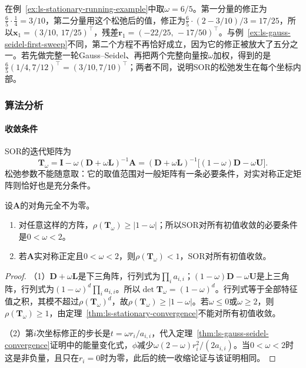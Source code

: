 \begin{example}[SOR迭代的第一轮]
\label{ex:ls-sor-first-sweep}
在例~\ref{ex:ls-stationary-running-example}中取$\omega=6/5$。第一分量的修正为$\tfrac65\cdot\tfrac14=3/10$，第二分量用这个松弛后的值，修正为$\tfrac65\cdot(2-3/10)/3=17/25$，所以$\bm x_1=(3/10,\,17/25)^\top$，残差$\bm r_1=(-22/25,\,-17/50)^\top$。与例~\ref{ex:ls-gauss-seidel-first-sweep}不同，第二个方程不再恰好成立，因为它的修正被放大了五分之一。若先做完整一轮Gauss--Seidel、再把两个完整向量按$\omega$加权，得到的是$\tfrac65(1/4,7/12)^\top=(3/10,7/10)^\top$；两者不同，说明SOR的松弛发生在每个坐标内部。
\end{example}

\subsubsection{算法分析}

\paragraph{收敛条件}
SOR的迭代矩阵为
\[
\bm T_\omega=\bm I-\omega(\bm D+\omega\bm L)^{-1}\bm A=(\bm D+\omega\bm L)^{-1}\bigl[(1-\omega)\bm D-\omega\bm U\bigr].
\]
松弛参数不能随意取：它的取值范围对一般矩阵有一条必要条件，对实对称正定矩阵则恰好也是充分条件。
\begin{theorem}[SOR迭代的收敛条件]
\label{thm:ls-sor-convergence}
设$\bm A$的对角元全不为零。
\begin{enumerate}
\item 对任意这样的方阵，$\rho(\bm T_\omega)\geq|1-\omega|$；所以SOR对所有初值收敛的必要条件是$0<\omega<2$。
\item 若$\bm A$实对称正定且$0<\omega<2$，则$\rho(\bm T_\omega)<1$，SOR对所有初值收敛。
\end{enumerate}
\end{theorem}
\begin{proof}
（1）$\bm D+\omega\bm L$是下三角阵，行列式为$\prod_i a_{i,i}$；$(1-\omega)\bm D-\omega\bm U$是上三角阵，行列式为$(1-\omega)^d\prod_i a_{i,i}$。所以$\det\bm T_\omega=(1-\omega)^d$。行列式等于全部特征值之积，其模不超过$\rho(\bm T_\omega)^d$，故$\rho(\bm T_\omega)\geq|1-\omega|$。若$\omega\leq0$或$\omega\geq2$，则$\rho(\bm T_\omega)\geq1$，由定理~\ref{thm:ls-stationary-convergence}不能对所有初值收敛。

（2）第$i$次坐标修正的步长是$t=\omega r_i/a_{i,i}$，代入定理~\ref{thm:ls-gauss-seidel-convergence}证明中的能量变化式，$\phi$减少$\omega(2-\omega)r_i^2/(2a_{i,i})$。当$0<\omega<2$时这是非负量，且只在$r_i=0$时为零，此后的统一收缩论证与该证明相同。
\end{proof}

